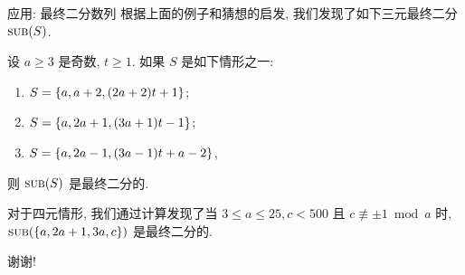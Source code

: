 \documentclass[aspectratio=169]{ctexbeamer}
\DeclareMathOperator*{\SUB}{{\text{{\upshape\textsc{sub}}}}}
\begin{document}
\begin{frame}{应用: 最终二分数列}
	\onslide<+->
	根据上面的例子和猜想的启发, 我们发现了如下三元最终二分 $\SUB(S)$.
	\onslide<+->
	\begin{theorem}
		设 $a\ge 3$ 是奇数, $t\ge 1$.
		如果 $S$ 是如下情形之一:
		\begin{enumerate}[<*>]
			\item $S={\left\{a,a+2,(2a+2)t+1\right\}}$;
			\item $S={\left\{a,2a+1,(3a+1)t-1\right\}}$;
			\item $S={\left\{a,2a-1,(3a-1)t+a-2\right\}}$,
		\end{enumerate}
		则 $\SUB(S)$ 是最终二分的.
	\end{theorem}
	\onslide<+->
	对于四元情形, 我们通过计算发现了当 $3\le a\le 25, c<500$ 且 $c\not\equiv \pm1 \bmod a$ 时, $\SUB(\set{a,2a+1,3a,c})$ 是最终二分的.
\end{frame}



\begin{frame}
\begin{center}
\huge 谢谢!
\end{center}
\end{frame}
\end{document}
